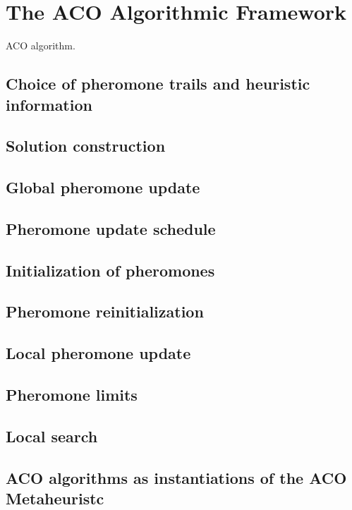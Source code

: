 \documentclass[12pt]{article}
\begin{document}
\section{The ACO Algorithmic Framework}

ACO algorithm.

\subsection{Choice of pheromone trails and heuristic information}

\subsection{Solution construction}

\subsection{Global pheromone update}

\subsection{Pheromone update schedule}

\subsection{Initialization of pheromones}

\subsection{Pheromone reinitialization}

\subsection{Local pheromone update}

\subsection{Pheromone limits}

\subsection{Local search}

\subsection{ACO algorithms as instantiations of the ACO Metaheuristc}
\end{document}
